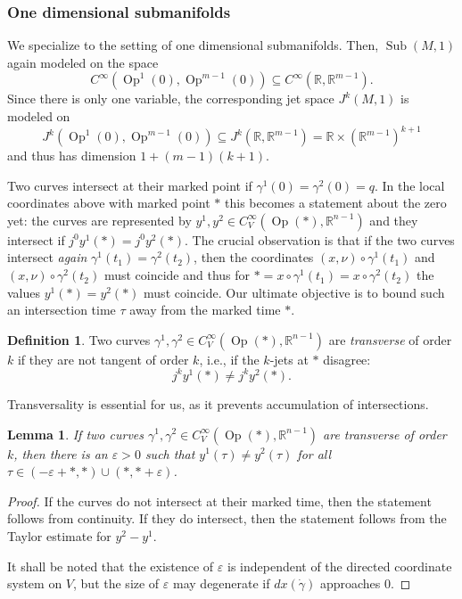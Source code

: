 \documentclass{amsart}
\newcommand{\RR}{\mathbb{R}}
\newcommand{\Sub}{\operatorname{Sub}}
\newcommand{\Op}{\operatorname{Op}}
\newtheorem{lemma}[proposition]{Lemma}
\theoremstyle{definition}
\newtheorem{definition}[proposition]{Definition}
\theoremstyle{remark}
\numberwithin{equation}{section}
\begin{document}

\subsubsection{One dimensional submanifolds}

We specialize to the setting of one dimensional submanifolds. Then, $\Sub(M,1)$ again modeled on the space 
$$C^\infty(\Op^1(0),\Op^{m-1}(0))\subseteq C^\infty(\RR,\RR^{m-1}).$$
Since there is only one variable, the corresponding jet space $J^k(M,1)$ is modeled on
$$J^k(\Op^1(0),\Op^{m-1}(0))\subseteq J^k(\RR,\RR^{m-1})=\RR\times(\RR^{m-1})^{k+1}$$
and thus has dimension $1+(m-1)(k+1)$. 


Two curves intersect  at their marked point if $\gamma^1(0)=\gamma^2(0)=q$. In the local coordinates above with marked point $*$ this becomes a statement about the zero yet: the curves are represented by $y^1,y^2\in C^\infty_V(\Op(*), \RR^{n-1})$ and they intersect if $j^0y^1(*)=j^0y^2(*)$. The crucial observation is that if the two curves intersect \emph{again} $\gamma^1(t_1)=\gamma^2(t_2)$, then the coordinates $(x,\nu)\circ\gamma^1(t_1)$ and $(x,\nu)\circ\gamma^2(t_2)$ must coincide and thus for $* =x\circ\gamma^1(t_1)=x\circ\gamma^2(t_2)$ the values $y^{1}(*)=y^{2}(*)$ must coincide. Our ultimate objective is to bound such an intersection time $\tau$ away from the marked time $*$. 
\begin{definition}\label{def:tangencyorder}
    Two curves $\gamma^1,\gamma^2\in C^\infty_V(\Op(*),\RR^{n-1})$ are \emph{transverse} of order $k$ if they are not tangent of order $k$, i.e., if the $k$-jets at $*$ disagree:
    $$j^ky^{1}(*)\neq j^ky^{2}(*).$$
\end{definition}
Transversality is essential for us, as it prevents accumulation of intersections.
\begin{lemma}\label{lem:transverseQ}
    If two curves $\gamma^1,\gamma^2\in C^\infty_V(\Op(*),\RR^{n-1})$ are transverse of order $k$, then there is an $\varepsilon>0$ such that $y^1(\tau)\neq y^2(\tau)$ for all $\tau\in (-\varepsilon+*,*)\cup(*,*+\varepsilon)$.
\end{lemma}
\begin{proof}
    If the curves do not intersect at their marked time, then the statement follows from continuity. If they do intersect, then the statement follows from the Taylor estimate for $y^{2}-y^{1}$.
    
    It shall be noted that the existence of $\varepsilon$ is independent of the directed coordinate system on $V$, but the size of $\varepsilon$ may degenerate if $dx(\dot\gamma)$ approaches 0. 
\end{proof}
\end{document}
